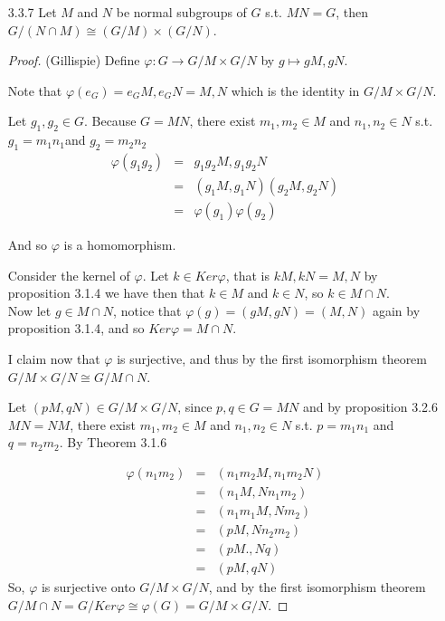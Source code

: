 \documentclass[10pt]{article}
\renewcommand{\phi}{\varphi}
\begin{document}
\begin{itemize}
\begin{proof}(Hazlett)
Suppose $K \not \leq H$.  Then $H \subset K$.  Hence we can deduce
that $|G : HK| = 1$ since $|G: H| = p$, a prime.  So $HK = G$.  Then
by the Second Isomorphism Theorem we have $HK/H \cong K/H\cap K$.
Consequently $G/H \cong K/H\cap K$.  Therefore $|K: K\bigcap H| =
p$.
\end{proof}

\item[3.3.7] Let $M$ and $N$  be normal subgroups of $G$ s.t. $MN=G$, then $G/(N\cap M) \cong (G/M)\times (G/N)$.

\begin{proof} (Gillispie) Define $\phi:G\rightarrow G/M\times G/N$ by $g\mapsto gM,gN$.

Note that $\phi(e_{G})=e_{G}M,e_{G}N=M,N$ which is the identity in
$G/M\times G/N$.

Let $g_{1},g_{2}\in G$. Because $G=MN$, there exist $m_{1},m_{2}\in
M$ and $n_{1},n_{2}\in N$ s.t. $g_{1}=m_{1}n_{1}$and
$g_{2}=m_{2}n_{2}$\begin{eqnarray*}
\phi(g_{1}g_{2}) & = & g_{1}g_{2}M,g_{1}g_{2}N\\
 & = & (g_{1}M,g_{1}N)(g_{2}M,g_{2}N)\\
 & = & \phi(g_{1})\phi(g_{2})\end{eqnarray*}


And so $\phi$ is a homomorphism.

Consider the kernel of $\phi$. Let $k\in Ker\phi$, that is
$kM,kN=M,N$ by proposition 3.1.4 we have then that $k\in M$ and
$k\in N$, so
$k\in M\cap N$.\\
Now let $g\in M\cap N$, notice that $\phi(g)=(gM,gN)=(M,N)$ again by
proposition 3.1.4, and so $Ker\phi=M\cap N$.

I claim now that $\phi$ is surjective, and thus by the first
isomorphism theorem $G/M\times G/N\cong G/M\cap N$.

Let $(pM,qN)\in G/M\times G/N$, since $p,q\in G=MN$ and by
proposition 3.2.6 $MN=NM$, there exist $m_{1},m_{2}\in M$ and
$n_{1},n_{2}\in N$ s.t. $p=m_{1}n_{1}$ and $q=n_{2}m_{2}$. By
Theorem 3.1.6

\begin{eqnarray*}
\phi(n_{1}m_{2}) & = & (n_{1}m_{2}M,n_{1}m_{2}N)\\
 & = & (n_{1}M,Nn_{1}m_{2})\\
 & = & (n_{1}m_{1}M,Nm_{2})\\
 & = & (pM,Nn_{2}m_{2})\\
 & = & (pM.,Nq)\\
 & = & (pM,qN)\end{eqnarray*}
So, $\phi$ is surjective onto $G/M\times G/N$, and by the first
isomorphism theorem $G/M\cap N=G/Ker\phi\cong\phi(G)=G/M\times G/N$.
\end{proof}

\end{itemize}
\end{document}
